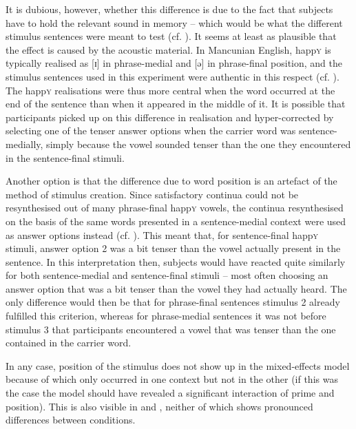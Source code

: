 It is dubious, however, whether this difference is due to the fact that subjects have to hold the relevant sound in memory -- which would be what the different stimulus sentences were meant to test (cf. ).
It seems at least as plausible that the effect is caused by the acoustic material.
In Mancunian English, happ\textsc{y} is typically realised as [ɪ] in phrase-medial and [ə] in phrase-final position, and the stimulus sentences used in this experiment were authentic in this respect (cf. ).
The happ\textsc{y} realisations were thus more central when the word occurred at the end of the sentence than when it appeared in the middle of it.
It is possible that participants picked up on this difference in realisation and hyper-corrected by selecting one of the tenser answer options when the carrier word was sentence-medially, simply because the vowel sounded tenser than the one they encountered in the sentence-final stimuli.

Another option is that the difference due to word position is an artefact of the method of stimulus creation.
Since satisfactory continua could not be resynthesised out of many phrase-final happ\textsc{y} vowels, the continua resynthesised on the basis of the same words presented in a sentence-medial context were used as answer options instead (cf. ).
This meant that, for sentence-final happ\textsc{y} stimuli, answer option 2 was a bit tenser than the vowel actually present in the sentence.
In this interpretation then, subjects would have reacted quite similarly for both sentence-medial and sentence-final stimuli -- most often choosing an answer option that was a bit tenser than the vowel they had actually heard.
The only difference would then be that for phrase-final sentences stimulus 2 already fulfilled this criterion, whereas for phrase-medial sentences it was not before stimulus 3 that participants encountered a vowel that was tenser than the one contained in the carrier word.

In any case, position of the stimulus does not show up in the mixed-effects model because of  which only occurred in one context but not in the other (if this was the case the model should have revealed a significant interaction of prime and position).
This is also visible in  and , neither of which shows pronounced differences between  conditions.

